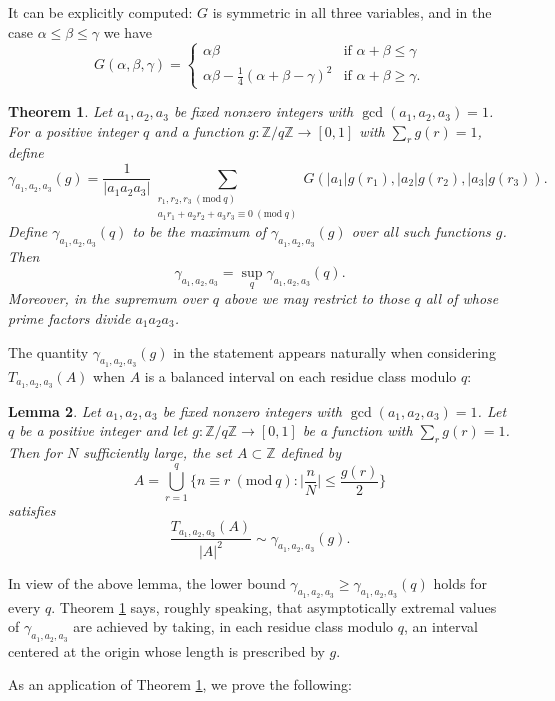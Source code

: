 \documentclass[12pt, notitlepage]{amsart}
\numberwithin{equation}{section}
\def\Z{\mathbb Z}
\def\gcd{\operatorname{gcd}}
\newcommand{\Mod}[1]{\ (\mathrm{mod}\ #1)}
\newtheorem{theorem}{Theorem}[section]
\newtheorem{lemma}[theorem]{Lemma}
\theoremstyle{remark}
\theoremstyle{definition}
\theoremstyle{remark}
\numberwithin{equation}{section}
\begin{document}
It can be explicitly computed: $G$ is symmetric in all three variables, and in the case $\alpha \leq \beta \leq \gamma$ we have
$$
G(\alpha,\beta,\gamma) = \begin{cases} \alpha\beta & \text{if }\alpha+\beta \leq \gamma \\ \alpha\beta - \frac{1}{4}(\alpha+\beta-\gamma)^2 & \text{if }\alpha+\beta\geq\gamma. \end{cases}
$$

\begin{theorem}\label{thm:main}
Let $a_1,a_2,a_3$ be fixed nonzero integers with $\gcd(a_1,a_2,a_3) = 1$. For a positive integer $q$ and a function $g: \Z/q\Z \rightarrow [0,1]$ with $\sum_r g(r) = 1$, define
$$
\gamma_{a_1,a_2,a_3}(g) = \frac{1}{|a_1a_2a_3|} \sum_{\substack{r_1,r_2,r_3\Mod{q} \\ a_1r_1+a_2r_2+a_3r_3\equiv 0\Mod{q}}} G(|a_1|g(r_1), |a_2|g(r_2), |a_3|g(r_3)).
$$
Define $\gamma_{a_1,a_2,a_3}(q)$ to be the maximum of $\gamma_{a_1,a_2,a_3}(g)$ over all such functions $g$. Then
$$
\gamma_{a_1,a_2,a_3} = \sup_q \gamma_{a_1,a_2,a_3}(q).
$$
Moreover, in the supremum over $q$ above we may restrict to those $q$ all of whose prime factors divide $a_1a_2a_3$.
\end{theorem}

The quantity $\gamma_{a_1,a_2,a_3}(g)$ in the statement appears naturally when considering $T_{a_1,a_2,a_3}(A)$ when $A$ is a balanced interval on each residue class modulo $q$:

\begin{lemma}\label{lem:local-sets}
Let $a_1,a_2,a_3$ be fixed nonzero integers with $\gcd(a_1,a_2,a_3) = 1$. Let $q$ be a positive integer and let $g: \Z/q\Z \rightarrow [0,1]$ be a function with $\sum_r g(r) = 1$. Then for $N$ sufficiently large, the set $A \subset \Z$ defined by
$$
A = \bigcup_{r=1}^q \Big\{n \equiv r\Mod{q}: \Big|\frac{n}{N}\Big| \leq \frac{g(r)}{2}\Big\}
$$
satisfies
$$
\frac{T_{a_1,a_2,a_3}(A)}{|A|^2} \sim \gamma_{a_1,a_2,a_3}(g).
$$
\end{lemma}

In view of the above lemma, the lower bound $\gamma_{a_1,a_2,a_3} \geq \gamma_{a_1,a_2,a_3}(q)$ holds for every $q$. Theorem \ref{thm:main} says, roughly speaking, that asymptotically extremal values of $\gamma_{a_1,a_2,a_3}$ are achieved  by taking, in each residue class modulo $q$, an interval
centered at the origin whose length is prescribed by $g$.
 
As an application of Theorem \ref{thm:main}, we prove the following:
\end{document}
